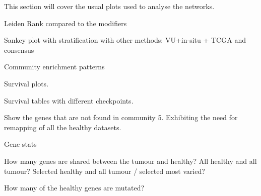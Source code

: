 This section will cover the usual plots used to analyse the networks.
\begin{todolist}
    \item[\done] Leiden Rank compared to the modifiers
    \item[\done] Sankey plot with stratification with other methods: VU+in-situ + TCGA and consensus
    \item[\done] Community enrichment patterns
    \item [\done] Survival plots.
    \item Survival tables with different checkpoints.
    \item Show the genes that are not found in community 5. Exhibiting the need for remapping of all the healthy datasets.
    \item Gene stats 
    \begin{todolist}
        \item How many genes are shared between the tumour and healthy? All healthy and all tumour? Selected healthy and all tumour / selected most varied?
        \item How many of the healthy genes are mutated?
    \end{todolist}
\end{todolist}
